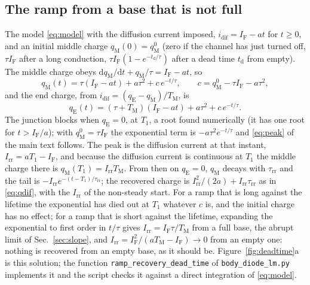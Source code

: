 \documentclass[10pt,a4paper]{scrartcl}
\newcommand{\IF}{I_\mathrm{F}}
\newcommand{\Irr}{I_\mathrm{rr}}
\newcommand{\td}{t_\mathrm{d}}
\newcommand{\taurr}{\tau_\mathrm{rr}}
\newcommand{\TM}{T_\mathrm{M}}
\newcommand{\Tone}{T_1}
\newcommand{\qE}{q_\mathrm{E}}
\newcommand{\qM}{q_\mathrm{M}}
\newcommand{\idif}{i_\mathrm{dif}}
\newcommand{\diff}{\mathrm{d}}
\begin{document}
\subsection{The ramp from a base that is not full}
\label{app:deadtime}
The model \eqref{eq:model} with the diffusion current imposed, $\idif = \IF - at$ for $t \ge 0$, and an initial middle charge $\qM(0) = \qM^0$ (zero if the channel has just turned off, $\tau\IF$ after a long conduction, $\tau\IF(1 - e^{-\td/\tau})$ after a dead time $\td$ from empty). The middle charge obeys $\diff\qM/\diff t + \qM/\tau = \IF - at$, so
\begin{equation}
\qM(t) = \tau(\IF - at) + a\tau^2 + c\,e^{-t/\tau} , \qquad c = \qM^0 - \tau\IF - a\tau^2 ,
\label{eq:qMramp}
\end{equation}
and the end charge, from $\idif = (\qE - \qM)/\TM$, is
\begin{equation}
\qE(t) = (\tau + \TM)(\IF - at) + a\tau^2 + c\,e^{-t/\tau} .
\label{eq:qEramp}
\end{equation}
The junction blocks when $\qE = 0$, at $\Tone$, a root found numerically (it has one root for $t > \IF/a$); with $\qM^0 = \tau\IF$ the exponential term is $-a\tau^2 e^{-t/\tau}$ and \eqref{eq:peak} of the main text follows. The peak is the diffusion current at that instant, $\Irr = a\Tone - \IF$, and because the diffusion current is continuous at $\Tone$ the middle charge there is $\qM(\Tone) = \Irr\TM$. From then on $\qE = 0$, $\qM$ decays with $\taurr$ and the tail is $-\Irr e^{-(t - \Tone)/\taurr}$; the recovered charge is $\Irr^2/(2a) + \Irr\taurr$ as in \eqref{eq:qdif}, with the $\Irr$ of the non-steady start. For a ramp that is long against the lifetime the exponential has died out at $\Tone$ whatever $c$ is, and the initial charge has no effect; for a ramp that is short against the lifetime, expanding the exponential to first order in $t/\tau$ gives $\Irr = \IF\tau/\TM$ from a full base, the abrupt limit of Sec.~\ref{sec:slope}, and $\Irr = \IF^2/(a\TM - \IF) \to 0$ from an empty one: nothing is recovered from an empty base, as it should be. Figure~\ref{fig:deadtime}a is this solution; the function \texttt{ramp\_recovery\_dead\_time} of \texttt{body\_diode\_lm.py} implements it and the script checks it against a direct integration of \eqref{eq:model}.
\end{document}
